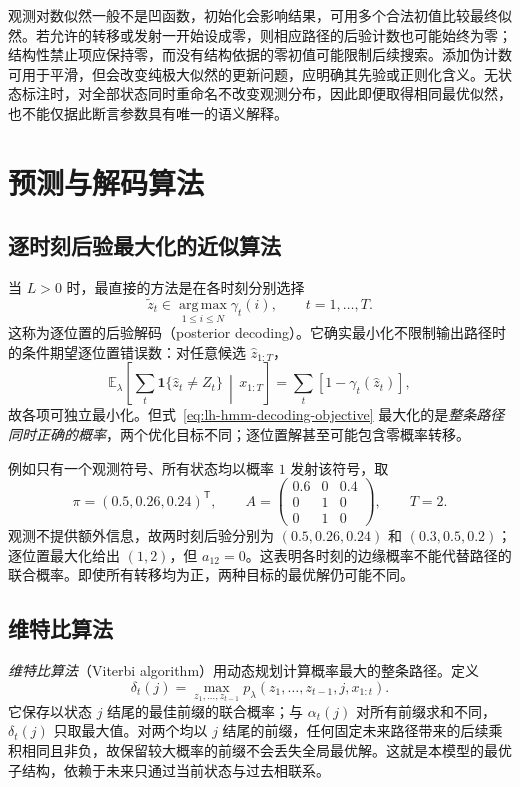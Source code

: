 观测对数似然一般不是凹函数，初始化会影响结果，可用多个合法初值比较最终似然。若允许的转移或发射一开始设成零，则相应路径的后验计数也可能始终为零；结构性禁止项应保持零，而没有结构依据的零初值可能限制后续搜索。添加伪计数可用于平滑，但会改变纯极大似然的更新问题，应明确其先验或正则化含义。无状态标注时，对全部状态同时重命名不改变观测分布，因此即便取得相同最优似然，也不能仅据此断言参数具有唯一的语义解释。

\section{预测与解码算法}
\label{sec:lh-hmm-decoding}

\subsection{逐时刻后验最大化的近似算法}

当 $L>0$ 时，最直接的方法是在各时刻分别选择
\begin{equation}
\label{eq:lh-hmm-marginal-decode}
 \widetilde z_t\in\operatorname*{arg\,max}_{1\leq i\leq N}\gamma_t(i),
 \qquad t=1,\ldots,T.
\end{equation}
这称为逐位置的后验解码（posterior decoding）。它确实最小化不限制输出路径时的条件期望逐位置错误数：对任意候选 $\widehat z_{1:T}$，
\[
 \mathbb E_\lambda\!\left[\sum_t\mathbf1\{\widehat z_t\ne Z_t\}\,\middle|\,x_{1:T}\right]
 =\sum_t[1-\gamma_t(\widehat z_t)],
\]
故各项可独立最小化。但式~\eqref{eq:lh-hmm-decoding-objective} 最大化的是\emph{整条路径同时正确的概率}，两个优化目标不同；逐位置解甚至可能包含零概率转移。

例如只有一个观测符号、所有状态均以概率 $1$ 发射该符号，取
\[
 \pi=(0.5,0.26,0.24)^{\mathsf T},\qquad
 A=\begin{pmatrix}0.6&0&0.4\\0&1&0\\0&1&0\end{pmatrix},\qquad T=2.
\]
观测不提供额外信息，故两时刻后验分别为 $(0.5,0.26,0.24)$ 和 $(0.3,0.5,0.2)$；逐位置最大化给出 $(1,2)$，但 $a_{12}=0$。这表明各时刻的边缘概率不能代替路径的联合概率。即使所有转移均为正，两种目标的最优解仍可能不同。

\subsection{维特比算法}

\emph{维特比算法}（Viterbi algorithm）用动态规划计算概率最大的整条路径。定义
\begin{equation}
\label{eq:lh-hmm-delta-def}
 \delta_t(j)=\max_{z_1,\ldots,z_{t-1}}
 p_\lambda(z_1,\ldots,z_{t-1},j,x_{1:t}).
\end{equation}
它保存以状态 $j$ 结尾的最佳前缀的联合概率；与 $\alpha_t(j)$ 对所有前缀求和不同，$\delta_t(j)$ 只取最大值。对两个均以 $j$ 结尾的前缀，任何固定未来路径带来的后续乘积相同且非负，故保留较大概率的前缀不会丢失全局最优解。这就是本模型的最优子结构，依赖于未来只通过当前状态与过去相联系。

